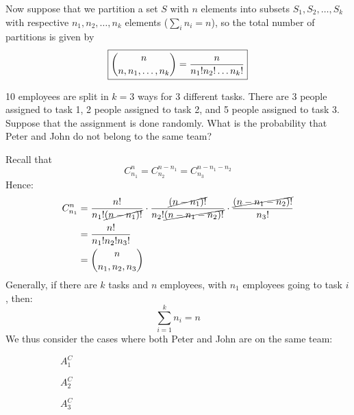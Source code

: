 \documentclass{article}
\begin{document}
	Now suppose that we partition a set $S$ with $n$ elements into subsets $S_1, S_2, \dots, S_k$ with respective $n_1, n_2, \dots, n_k$ elements ($\sum_i n_i = n$), so the total number of partitions is given by 
	$$
		\boxed{
		\label{eq:partno}
		\binom{n}{n, n_1, \dots, n_k} = \frac{n}{n_1 ! n_2 ! \dots n_k !}
		}
	$$
	\begin{exmp}
		10 employees are split in $k=3$ ways for $3$ different tasks. There are 3 people assigned to task 1, 2 people assigned to task 2, and 5 people assigned to task 3. Suppose that the assignment is done randomly. What is the probability that Peter and John do not belong to the same team?
	\end{exmp}
	\begin{sol}
		Recall that 
		$$ C_{n_1}^n = C_{n_{2}}^{n-n_1} = C_{n_3}^{n-n_1 - n_2}$$
		Hence:
		\begin{align*}
			C_{n_1}^n &= \frac{n!}{n_1 ! \cancel{(n-n_1)!}} \cdot \frac{\cancel{(n-n_1)!}}{n_2 ! \cancel{(n-n_1 - n_2)!}} \cdot \frac{\cancel{(n-n_1 -n_2)!}}{n_3!} \\
			&= \frac{n!}{n_1 ! n_2 ! n_3 !} \\
			&= \binom{n}{n_1, n_2, n_3}
		\end{align*}
	Generally, if there are $k$ tasks and $n$ employees, with $n_1$ employees going to task $i$, then:
	$$ \sum_{i=1}^k n_i = n$$ \noindent We thus consider the cases where both Peter and John are on the same team:
	\begin{figure}[h]
		\begin{subfigure}{0.3\textwidth}
			\begin{center}
				$A_1^C$ \\ $\quad$
				
			\end{center}
		\end{subfigure}
		\hfill
		\begin{subfigure}{0.3\textwidth}
			\begin{center}
				$A_2^C$ \\ $\quad$
				
			\end{center}
		\end{subfigure}
		\hfill
		\begin{subfigure}{0.3\textwidth}
			\begin{center}
				$A_3^C$ \\ $\quad$ 
				

\end{center}
\end{subfigure}
\end{figure}
\end{sol}
\end{document}
